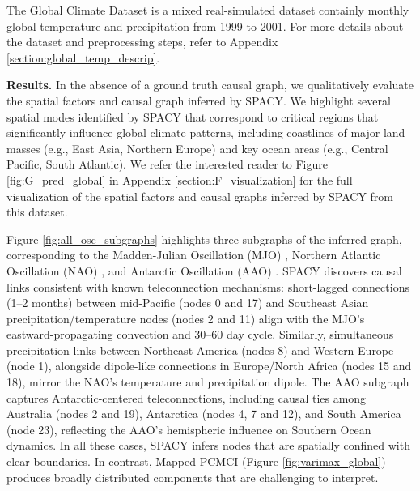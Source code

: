 The Global Climate Dataset \citep{baker2019linear} is a mixed real-simulated dataset containly monthly global temperature and precipitation from 1999 to 2001. For more details about the dataset and preprocessing steps, refer to Appendix \ref{section:global_temp_descrip}. 



\textbf{Results.} In the absence of a ground truth causal graph, we qualitatively evaluate the spatial factors and causal graph inferred by SPACY. We highlight several spatial modes identified by SPACY that correspond to critical regions that significantly influence global climate patterns, including coastlines of major land masses (e.g., East Asia, Northern Europe) and key ocean areas (e.g., Central Pacific, South Atlantic). We refer the interested reader to Figure \ref{fig:G_pred_global} in Appendix \ref{section:F_visualization} for the full visualization of 
the spatial factors and causal graphs inferred by SPACY from this dataset.


Figure \ref{fig:all_osc_subgraphs} highlights three subgraphs of the inferred graph, corresponding to the Madden-Julian Oscillation (MJO) \citep{MJODetectionofa4050DayOscillationintheZonalWindintheTropicalPacific,MJODescriptionofGlobalScaleCirculationCellsintheTropicswitha4050DayPeriod}, Northern Atlantic Oscillation (NAO) \citep{NAOsignificanceandimpact,NAOdecadal,NAOSensitivityofTeleconnectionPatternstotheSignofTheirPrimaryActionCenter}, and Antarctic Oscillation (AAO) \citep{AAODavid2002Antarctic,AAOKingtse2000Antarctic}. SPACY discovers causal links consistent with known teleconnection mechanisms: short-lagged connections (1–2 months) between mid-Pacific (nodes 0 and 17) and Southeast Asian precipitation/temperature nodes (nodes 2 and 11) align with the MJO’s eastward-propagating convection and 30–60 day cycle. Similarly, simultaneous precipitation links between Northeast America (nodes 8) and Western Europe (node 1), alongside dipole-like connections in Europe/North Africa (nodes 15 and 18), mirror the NAO’s temperature and precipitation dipole. The AAO subgraph captures Antarctic-centered teleconnections, including causal ties among Australia (nodes 2 and 19), Antarctica (nodes 4, 7 and 12), and South America (node 23), reflecting the AAO’s hemispheric influence on Southern Ocean dynamics. In all these cases, SPACY infers nodes that are spatially confined with clear boundaries. In contrast, Mapped PCMCI (Figure \ref{fig:varimax_global}) produces broadly distributed components that are challenging to interpret.

